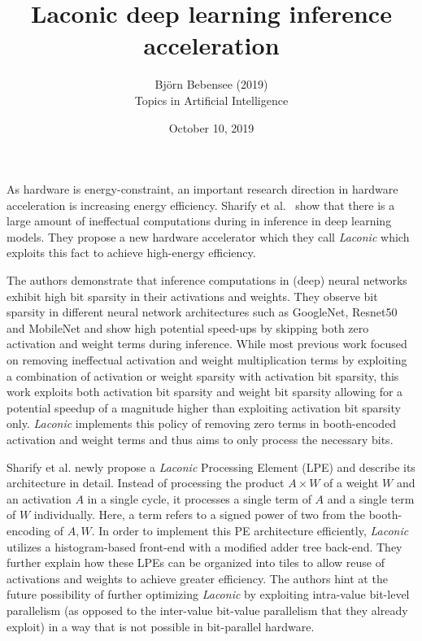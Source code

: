\documentclass[12pt]{article}
\begin{document}
 
 
\title{Laconic deep learning inference acceleration}
\author{Bj\"orn Bebensee (2019)\\ %
Topics in Artificial Intelligence}
\date{October 10, 2019}
\maketitle

\noindent
As hardware is energy-constraint, an important research direction in hardware acceleration is increasing energy efficiency. Sharify et al.~\cite{sharify} show that there is a large amount of ineffectual computations during in inference in deep learning models. They propose a new hardware accelerator which they call \emph{Laconic} which exploits this fact to achieve high-energy efficiency.

The authors demonstrate that inference computations in (deep) neural networks exhibit high bit sparsity in their activations and weights. They observe bit sparsity in different neural network architectures such as GoogleNet, Resnet50 and MobileNet and show high potential speed-ups by skipping both zero activation and weight terms during inference. While most previous work focused on removing ineffectual activation and weight multiplication terms by exploiting a combination of activation or weight sparsity with activation bit sparsity, this work exploits both activation bit sparsity and weight bit sparsity allowing for a potential speedup of a magnitude higher than exploiting activation bit sparsity only. \emph{Laconic} implements this policy of removing zero terms in booth-encoded activation and weight terms and thus aims to only process the necessary bits.

Sharify et al. newly propose a \emph{Laconic} Processing Element (LPE) and describe its architecture in detail. Instead of processing the product $A \times W$ of a weight $W$ and an activation $A$ in a single cycle, it processes a single term of $A$ and a single term of $W$ individually. Here, a term refers to a signed power of two from the booth-encoding of $A,W$. In order to implement this PE architecture efficiently, \emph{Laconic} utilizes a histogram-based front-end with a modified adder tree back-end. They further explain how these LPEs can be organized into tiles to allow reuse of activations and weights to achieve greater efficiency. The authors hint at the future possibility of further optimizing \emph{Laconic} by exploiting intra-value bit-level parallelism (as opposed to the inter-value bit-value parallelism that they already exploit) in a way that is not possible in bit-parallel hardware.
\end{document}
